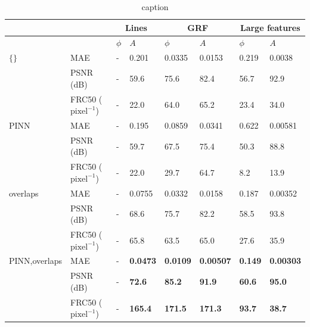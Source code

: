 \documentclass[sn-mathphys]{sn-jnl}%
\theoremstyle{thmstyleone}%
\theoremstyle{thmstyletwo}%
\theoremstyle{thmstylethree}%
\begin{document}
\begin{table}[h]
\begin{center}
\caption{caption }\label{tab1}%
\begin{tabular}{p{2cm}l|ll|ll|ll}
\toprule
& \multicolumn{1}{c}{} & \multicolumn{2}{c}{Lines} & \multicolumn{2}{c}{GRF} & \multicolumn{2}{c}{Large features}\\
\midrule
&
& $\phi$ & $A$
& $\phi$ & $A$
& $\phi$ & $A$ \\
\midrule
$\{\}$\footnotemark[1]
& MAE & - & 0.201 & 0.0335 & 0.0153 & 0.219 & 0.0038 \\
& PSNR (dB) & - & 59.6 & 75.6 & 82.4 & 56.7 & 92.9 \\
& FRC50 ($\mathrm{pixel}^{-1}$) & - & 22.0 & 64.0 & 65.2 & 23.4 & 34.0 \\
\midrule
PINN
& MAE & - & 0.195 & 0.0859 & 0.0341 & 0.622 & 0.00581 \\
& PSNR (dB) & - & 59.7 & 67.5 & 75.4 & 50.3 & 88.8 \\
& FRC50 ($\mathrm{pixel}^{-1}$) & - & 22.0 & 29.7 & 64.7 & 8.2 & 13.9 \\
\midrule
overlaps
& MAE & - & 0.0755 & 0.0332 & 0.0158 & 0.187 & 0.00352 \\
& PSNR (dB) & - & 68.6 & 75.7 & 82.2 & 58.5 & 93.8 \\
& FRC50 ($\mathrm{pixel}^{-1}$) & - & 65.8 & 63.5 & 65.0 & 27.6 & 35.9 \\
\midrule
PINN,overlaps\footnotemark[2]
& MAE & - & \textbf{0.0473} & \textbf{0.0109} & \textbf{0.00507} & \textbf{0.149} & \textbf{0.00303} \\
& PSNR (dB) & - & \textbf{72.6} & \textbf{85.2} & \textbf{91.9} & \textbf{60.6} & \textbf{95.0} \\
& FRC50 ($\mathrm{pixel}^{-1}$) & - & \textbf{165.4} & \textbf{171.5} & \textbf{171.3} & \textbf{93.7} & \textbf{38.7} \\
\midrule
\end{tabular}
\end{center}
\end{table}
\end{document}
